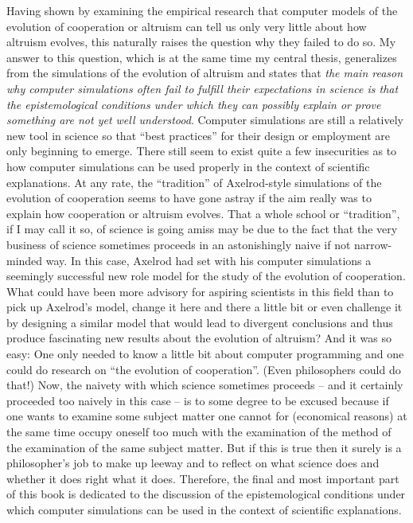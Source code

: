 Having shown by examining the empirical research that computer models of the
evolution of cooperation or altruism can tell us only very little about how
altruism evolves, this naturally raises the question why they failed to do so.
My answer to this question, which is at the same time my central thesis,
generalizes from the simulations of the evolution of altruism and states that
{\em the main reason why computer simulations often fail to fulfill their
  expectations in science is that the epistemological conditions under which
  they can possibly explain or prove something are not yet well understood}.
Computer simulations are still a relatively new tool in science so that ``best
practices'' for their design or employment are only beginning to emerge. There
still seem to exist quite a few insecurities as to how computer simulations
can be used properly in the context of scientific explanations. At any rate,
the ``tradition'' of Axelrod-style simulations of the evolution of cooperation
seems to have gone astray if the aim really was to explain how cooperation or
altruism evolves. That a whole school or ``tradition'', if I may call it so,
of science is going amiss may be due to the fact that the very business of
science sometimes proceeds in an astonishingly naive if not narrow-minded way.
In this case, Axelrod had set with his computer simulations a seemingly
successful new role model for the study of the evolution of cooperation. What
could have been more advisory for aspiring scientists in this field than to
pick up Axelrod's model, change it here and there a little bit or even
challenge it by designing a similar model that would lead to divergent
conclusions and thus produce fascinating new results about the evolution of
altruism?  And it was so easy: One only needed to know a little bit about
computer programming and one could do research on ``the evolution of
cooperation''. (Even philosophers could do that!)  Now, the naivety with which
science sometimes proceeds -- and it certainly proceeded too naively in this
case -- is to some degree to be excused because if one wants to examine some
subject matter one cannot for (economical reasons) at the same time occupy
oneself too much with the examination of the method of the examination of the
same subject matter. But if this is true then it surely is a philosopher's job
to make up leeway and to reflect on what science does and whether it does right what it does. Therefore, the final and most important part of this book is
dedicated to the discussion of the epistemological conditions under which
computer simulations can be used in the context of scientific explanations.
